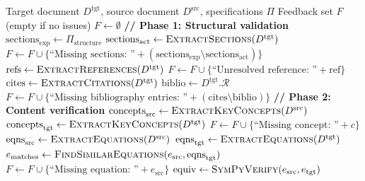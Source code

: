 \documentclass{ieeeaccess}
\begin{document}
\begin{algorithm}[!t]
\caption{Symbolically-Augmented Document Verification (SADV)}
\label{alg:sadv}
\scriptsize
\begin{algorithmic}[1]
\Require Target document \(D^{\text{tgt}}\), source document \(D^{\text{src}}\), specifications \(\Pi\)
\Ensure Feedback set \(F\) (empty if no issues)
\State \(F \gets \emptyset\) 
\State
\State \textbf{// Phase 1: Structural validation}
\State \(\text{sections}_{\text{exp}} \gets \Pi_{\text{structure}}\) 
\State \(\text{sections}_{\text{act}} \gets \textsc{ExtractSections}(D^{\text{tgt}})\) 
    \State \(F \gets F \cup \{\text{``Missing sections: ''} + (\text{sections}_{\text{exp}} \setminus \text{sections}_{\text{act}})\}\)
\EndIf
\State
\State \(\text{refs} \gets \textsc{ExtractReferences}(D^{\text{tgt}})\) 
        \State \(F \gets F \cup \{\text{``Unresolved reference: ''} + \text{ref}\}\)
    \EndIf
\EndFor
\State
\State \(\text{cites} \gets \textsc{ExtractCitations}(D^{\text{tgt}})\)
\State \(\text{biblio} \gets D^{\text{tgt}}.\mathcal{R}\)
    \State \(F \gets F \cup \{\text{``Missing bibliography entries: ''} + (\text{cites} \setminus \text{biblio})\}\)
\EndIf
\State
\State \textbf{// Phase 2: Content verification}
\State \(\text{concepts}_{\text{src}} \gets \textsc{ExtractKeyConcepts}(D^{\text{src}})\) 
\State \(\text{concepts}_{\text{tgt}} \gets \textsc{ExtractKeyConcepts}(D^{\text{tgt}})\)
        \State \(F \gets F \cup \{\text{``Missing concept: ''} + c\}\)
    \EndIf
\EndFor
\State
\State \(\text{eqns}_{\text{src}} \gets \textsc{ExtractEquations}(D^{\text{src}})\)
\State \(\text{eqns}_{\text{tgt}} \gets \textsc{ExtractEquations}(D^{\text{tgt}})\)
    \State \(e_{\text{matches}} \gets \textsc{FindSimilarEquations}(e_{\text{src}}, \text{eqns}_{\text{tgt}})\)
        \State \(F \gets F \cup \{\text{``Missing equation: ''} + e_{\text{src}}\}\)
    \Else
            \State \(\text{equiv} \gets \textsc{SymPyVerify}(e_{\text{src}}, e_{\text{tgt}})\) 

\end{algorithmic}
\end{algorithm}
\end{document}
